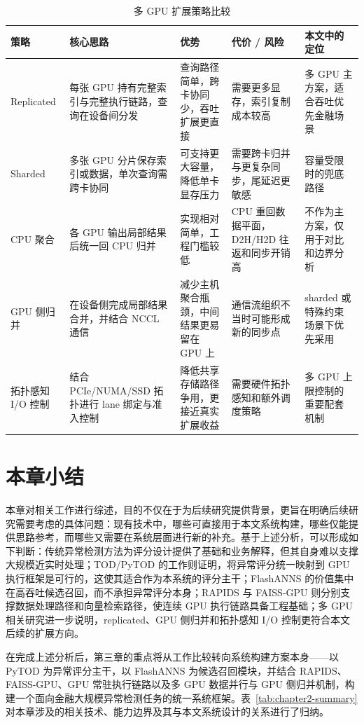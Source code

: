 \begin{table}[htbp]
  \caption{多 GPU 扩展策略比较}
  \label{tab:multi-gpu-strategies}
  \centering
  \small
  \setlength{\tabcolsep}{3pt}
  \renewcommand{\arraystretch}{1.25}
  \begin{tabularx}{\linewidth}{@{}P{2.0cm}Y Y Y Y@{}}
    \toprule
    策略 & 核心思路 & 优势 & 代价 / 风险 & 本文中的定位 \\
    \midrule
    Replicated & 每张 GPU 持有完整索引与完整执行链路，查询在设备间分发 & 查询路径简单，跨卡协同少，吞吐扩展更直接 & 需要更多显存，索引复制成本较高 & 多 GPU 主方案，适合吞吐优先金融场景 \\
    Sharded & 多张 GPU 分片保存索引或数据，单次查询需跨卡协同 & 可支持更大容量，降低单卡显存压力 & 需要跨卡归并与更复杂同步，尾延迟更敏感 & 容量受限时的兜底路径 \\
    CPU 聚合 & 各 GPU 输出局部结果后统一回 CPU 归并 & 实现相对简单，工程门槛较低 & CPU 重回数据平面，D2H/H2D 往返和同步开销高 & 不作为主方案，仅用于对比和边界分析 \\
    GPU 侧归并 & 在设备侧完成局部结果合并，并结合 NCCL 通信 & 减少主机聚合瓶颈，中间结果更易留在 GPU 上 & 通信流组织不当时可能形成新的同步点 & sharded 或特殊约束场景下优先采用 \\
    拓扑感知 I/O 控制 & 结合 PCIe/NUMA/SSD 拓扑进行 lane 绑定与准入控制 & 降低共享存储路径争用，更接近真实扩展收益 & 需要硬件拓扑感知和额外调度策略 & 多 GPU 上限控制的重要配套机制 \\
    \bottomrule
  \end{tabularx}
\end{table}

\section{本章小结}

本章对相关工作进行综述，目的不仅在于为后续研究提供背景，更旨在明确后续研究需要考虑的具体问题：现有技术中，哪些可直接用于本文系统构建，哪些仅能提供思路参考，而哪些又需要在系统层面进行新的补充。基于上述分析，可以形成如下判断：传统异常检测方法为评分设计提供了基础和业务解释，但其自身难以支撑大规模近实时处理；TOD/PyTOD 的工作则证明，将异常评分统一映射到 GPU 执行框架是可行的，这使其适合作为本系统的评分主干；FlashANNS 的价值集中在高吞吐候选召回，而不承担异常评分本身；RAPIDS 与 FAISS-GPU 则分别支撑数据处理路径和向量检索路径，使连续 GPU 执行链路具备工程基础；多 GPU 相关研究进一步说明，replicated、GPU 侧归并和拓扑感知 I/O 控制更符合本文后续的扩展方向。

在完成上述分析后，第三章的重点将从工作比较转向系统构建方案本身——以 PyTOD 为异常评分主干，以 FlashANNS 为候选召回模块，并结合 RAPIDS、FAISS-GPU、GPU 常驻执行链路以及多 GPU 数据并行与 GPU 侧归并机制，构建一个面向金融大规模异常检测任务的统一系统框架。表~\ref{tab:chapter2-summary}对本章涉及的相关技术、能力边界及其与本文系统设计的关系进行了归纳。

